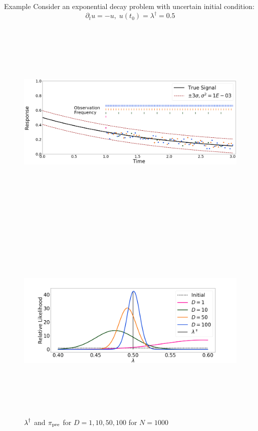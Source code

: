 \begin{block}{Example}
\centering
    Consider an exponential decay problem with uncertain initial condition:
    \begin{equation*}
        \partial_t u = - u, \; u(t_0) = \lambda^\dagger = 0.5
    \end{equation*}

    \begin{figure}
        \includegraphics[height=10cm]{exponential_decay_response_sigma-10E-4}
    \end{figure}


\vspace{1cm}

\centering
{}
\vspace{-1cm}
    \begin{figure}
        \includegraphics[height=10cm]{updated_convergence_sigma-10E-4}
        \caption*{$\operatorname*{\lambda}^\dagger$ and $\operatorname*{\pi_{pre}}$ for $D=1, 10, 50, 100$ for $N=1000$}
    \end{figure}


\end{block}
